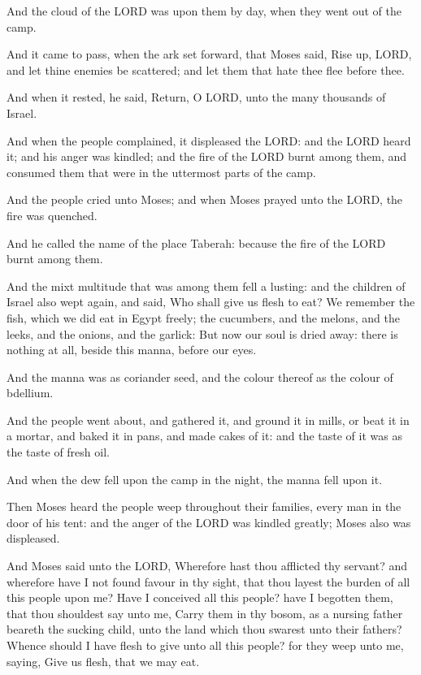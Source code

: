 \Verse And the cloud of the LORD was upon them by day, when they went
out of the camp.

\Verse And it came to pass, when the ark set forward, that Moses said,
Rise up, LORD, and let thine enemies be scattered; and let them that
hate thee flee before thee.

\Verse And when it rested, he said, Return, O LORD, unto the many
thousands of Israel.


\Chapter
\Verse And when the people complained, it displeased the LORD: and the
LORD heard it; and his anger was kindled; and the fire of the LORD
burnt among them, and consumed them that were in the uttermost parts
of the camp.

\Verse And the people cried unto Moses; and when Moses prayed unto the
LORD, the fire was quenched.

\Verse And he called the name of the place Taberah: because the fire of
the LORD burnt among them.

\Verse And the mixt multitude that was among them fell a lusting: and
the children of Israel also wept again, and said, Who shall give us
flesh to eat?  \Verse We remember the fish, which we did eat in Egypt
freely; the cucumbers, and the melons, and the leeks, and the onions,
and the garlick: \Verse But now our soul is dried away: there is nothing
at all, beside this manna, before our eyes.

\Verse And the manna was as coriander seed, and the colour thereof as
the colour of bdellium.

\Verse And the people went about, and gathered it, and ground it in
mills, or beat it in a mortar, and baked it in pans, and made cakes of
it: and the taste of it was as the taste of fresh oil.

\Verse And when the dew fell upon the camp in the night, the manna fell
upon it.

\Verse Then Moses heard the people weep throughout their families,
every man in the door of his tent: and the anger of the LORD was
kindled greatly; Moses also was displeased.

\Verse And Moses said unto the LORD, Wherefore hast thou afflicted thy
servant? and wherefore have I not found favour in thy sight, that thou
layest the burden of all this people upon me?  \Verse Have I conceived
all this people? have I begotten them, that thou shouldest say unto
me, Carry them in thy bosom, as a nursing father beareth the sucking
child, unto the land which thou swarest unto their fathers?  \Verse
Whence should I have flesh to give unto all this people? for they weep
unto me, saying, Give us flesh, that we may eat.

